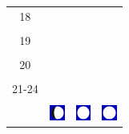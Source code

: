 \documentclass[a4paper,12pt, tikz]{scrartcl}
\begin{document}
\begin{tabularx}{\linewidth}{|c|X|X|X|}
      \hline
      18&   &       &    \\
        &   &       &    \\
      \hline
      19&   &       &    \\
        &   &       &    \\
      \hline
      20&   &       &    \\
        &   &       &    \\
      \hline
      21-24&   &       &    \\
        &   &       &    \\
      \hline  
      & \vspace{0.01cm} \centerline{\includegraphics[width=0.5cm]{moon_phases/Moon_phase_3.svg.png}} \vspace{0.1cm} & \vspace{0.01cm} \centerline{\includegraphics[width=0.5cm]{moon_phases/Moon_phase_4.svg.png}} \vspace{0.1cm} & \vspace{0.01cm} \centerline{\includegraphics[width=0.5cm]{moon_phases/Moon_phase_4.svg.png}} \vspace{0.1cm}\\
      \hline   
    \end{tabularx}




    \newpage

        \noindent
\end{document}
